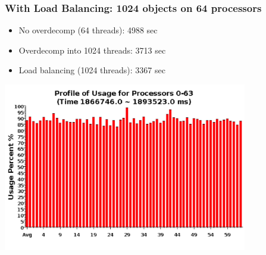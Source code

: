 {\begin{frame}[fragile]
\frametitle{With Load Balancing: 1024 objects on 64 processors}
\begin{center}
\begin{itemize}
\item No overdecomp (64 threads): 4988 sec
\item Overdecomp into 1024 threads: 3713 sec
\item Load balancing (1024 threads): 3367 sec
\end{itemize}
\includegraphics[width=0.8\textwidth]{figures/usageLB.png}
\end{center}
\end{frame}
}
